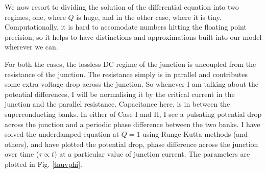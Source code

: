 \documentclass{thesis}
\begin{document}
We now resort to dividing the solution of the differential equation into two regimes, one, where $Q$ is huge, and in the other case, where it is tiny. Computationally, it is hard to accomodate numbers hitting the floating point precision, so it helps to have distinctions and approximations built into our model wherever we can.

For both the cases, the lossless DC regime of the junction is uncoupled from the resistance of the junction. The resistance simply is in parallel and contributes some extra voltage drop across the junction. So whenever I am talking about the potential differences, I will be normalising it by the critical current in the junction and the parallel resistance. Capacitance here, is in between the superconducting banks. In either of Case I and II, I see a pulsating potential drop across the junction and a periodic phase difference between the two banks. I have solved the underdamped equation at $Q=1$ using Runge Kutta methods (and others), and have plotted the potential drop, phase difference across the junction over time ($\tau \propto t$) at a particular value of junction current. The parameters are plotted in Fig. \ref{tauvphi}.
\end{document}
